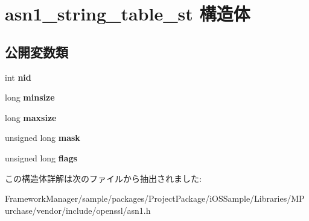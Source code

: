 \hypertarget{structasn1__string__table__st}{}\section{asn1\+\_\+string\+\_\+table\+\_\+st 構造体}
\label{structasn1__string__table__st}
\subsection*{公開変数類}
\begin{DoxyCompactItemize}
\item 
\hypertarget{structasn1__string__table__st_afc0e790d52b34b5f3705214ee92fa207}{}int {\bfseries nid}\label{structasn1__string__table__st_afc0e790d52b34b5f3705214ee92fa207}

\item 
\hypertarget{structasn1__string__table__st_a4428b94f772280133e146a55e2731610}{}long {\bfseries minsize}\label{structasn1__string__table__st_a4428b94f772280133e146a55e2731610}

\item 
\hypertarget{structasn1__string__table__st_a8a4de03a35f1840e86f9aa8ba934a42f}{}long {\bfseries maxsize}\label{structasn1__string__table__st_a8a4de03a35f1840e86f9aa8ba934a42f}

\item 
\hypertarget{structasn1__string__table__st_a3dcff470ab384f991b68bbd9f2034d55}{}unsigned long {\bfseries mask}\label{structasn1__string__table__st_a3dcff470ab384f991b68bbd9f2034d55}

\item 
\hypertarget{structasn1__string__table__st_a37e4651359671ca1bd5b3f8013ca5ef4}{}unsigned long {\bfseries flags}\label{structasn1__string__table__st_a37e4651359671ca1bd5b3f8013ca5ef4}

\end{DoxyCompactItemize}


この構造体詳解は次のファイルから抽出されました\+:\begin{DoxyCompactItemize}
\item 
Framework\+Manager/sample/packages/\+Project\+Package/i\+O\+S\+Sample/\+Libraries/\+M\+Purchase/vendor/include/openssl/asn1.\+h\end{DoxyCompactItemize}
